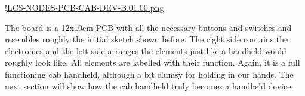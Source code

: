 !\href{./Boards/LCS-NODES-PCB-CAB-DEV-B.01.00.png }{LCS-NODES-PCB-CAB-DEV-B.01.00.png}

The board is a 12x10cm PCB with all the necessary buttons and switches and resembles roughly the initial sketch shown before. The right side contains the electronics and the left side arranges the elements just like a handheld would roughly look like. All elements are labelled with their function. Again, it is a full functioning cab handheld, although a bit clumsy for holding in our hands. The next section will show how the cab handheld truly becomes a handheld device.
